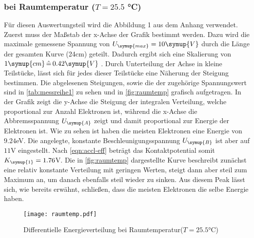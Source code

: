         \subsubsection{bei Raumtemperatur ($T = 25.5 $ °C)}
        \label{sec:raumtemp}
        Für diesen Auswertungsteil wird die Abbildung 1 aus dem Anhang verwendet. Zuerst muss der Maßstab der x-Achse der Grafik bestimmt werden.
        Dazu wird die maximale gemessene Spannung von $U_{\symup{max}} = 10 \symup{V}$ durch die Länge der gesamten Kurve (24cm) geteilt.
        Dadurch ergibt sich eine Skalierung von $1 \symup{cm} \, \hat{=} \, 0.42 \symup{V}$ . Durch Unterteilung der Achse 
        in kleine Teilstücke, lässt sich für jedes dieser Teilstücke eine Näherung der Steigung bestimmen. Die abgelesenen Steigungen, sowie
        die der zugehörige Spannungswert sind in \autoref{tab:messreihe1} zu sehen und in \autoref{fig:raumtemp} grafisch aufgetragen.
        In der Grafik zeigt die y-Achse die Steigung der integralen Verteilung, welche proportional zur Anzahl Elektronen ist, während die x-Achse
        die Abbremsspannung $U_{\symup{A}}$ zeigt und damit proportional zur Energie der Elektronen ist.
        Wie zu sehen ist haben die meisten Elektronen eine Energie von $9.24$eV. Die angelegte, konstante Beschleunigungsspannung $U_{\symup{B}}$
        ist aber auf $11$V eingestellt. Nach \eqref{eqn:accl-eff} beträgt das Kontaktpotential somit $K_{\symup{1}} = 1.76$V. Die in \autoref{fig:raumtemp} dargestellte 
        Kurve beschreibt zunächst eine relativ konstante Verteilung mit geringen Werten, steigt dann aber steil zum Maximum an, um danach ebenfalls steil
        wieder zu sinken. Aus diesem Peak lässt sich, wie bereits erwähnt, schließen, dass die meisten Elektronen die selbe Energie haben. 
        
        \begin{figure}
          \centering
          \texttt{[image: raumtemp.pdf]}
          \caption{Differentielle Energieverteilung bei Raumtemperatur($T = 25.5$°C)}
          \label{fig:raumtemp}
        \end{figure}



